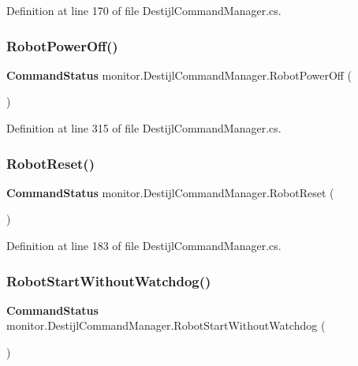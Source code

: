 Definition at line 170 of file Destijl\+Command\+Manager.\+cs.

\mbox{\label{classmonitor_1_1_destijl_command_manager_acb242a71fa40d4001dc1bc31d5bdc53f}} 
\subsubsection{Robot\+Power\+Off()}
{\footnotesize\ttfamily \textbf{ Command\+Status} monitor.\+Destijl\+Command\+Manager.\+Robot\+Power\+Off (\begin{DoxyParamCaption}{ }\end{DoxyParamCaption})}



Definition at line 315 of file Destijl\+Command\+Manager.\+cs.

\mbox{\label{classmonitor_1_1_destijl_command_manager_abe223aa12456e3f1c2519e9c379d891a}} 
\subsubsection{Robot\+Reset()}
{\footnotesize\ttfamily \textbf{ Command\+Status} monitor.\+Destijl\+Command\+Manager.\+Robot\+Reset (\begin{DoxyParamCaption}{ }\end{DoxyParamCaption})}



Definition at line 183 of file Destijl\+Command\+Manager.\+cs.

\mbox{\label{classmonitor_1_1_destijl_command_manager_a0c964baa3ecd4ff9d19857061413938b}} 
\subsubsection{Robot\+Start\+Without\+Watchdog()}
{\footnotesize\ttfamily \textbf{ Command\+Status} monitor.\+Destijl\+Command\+Manager.\+Robot\+Start\+Without\+Watchdog (\begin{DoxyParamCaption}{ }\end{DoxyParamCaption})}



